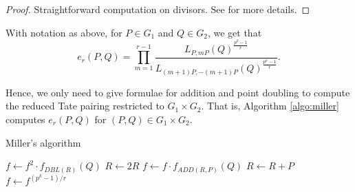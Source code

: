 \begin{proof}
Straightforward computation on divisors. See \cite{Mil} for more details.
\end{proof}

\begin{corollary}
With notation as above, for $P \in G_{1}$ and $Q \in G_{2}$, we get that
\[e_{r}(P,Q)= \prod_{m=1}^{r-1} \frac{L_{P,mP}(Q)^{\frac{p^{k}-1}{r}}}{L_{(m+1)P,-(m+1)P}(Q)^{\frac{p^{k}-1}{r}}}.\]
\end{corollary}

Hence, we only need to give formulae for addition and point doubling to compute the reduced Tate pairing restricted to $G_{1} \times G_{2}$. That is, Algorithm \ref{algo:miller} computes $e_{r}(P,Q)$ for $(P,Q) \in G_{1} \times G_{2}$.

\begin{algorithm}
\caption{Miller's algorithm}
\label{algo:miller}
\begin{algorithmic}[1]


		\State $f \leftarrow f^2 \cdot f_{DBL(R)}(Q)$
		\State $R \leftarrow 2R$
			\State $f \leftarrow f \cdot f_{ADD(R,P)}(Q)$
			\State $R \leftarrow R+P$
		\EndIf
	\EndFor
	\State $f \leftarrow f^{(p^k-1)/r}$

\end{algorithmic}
\end{algorithm}

